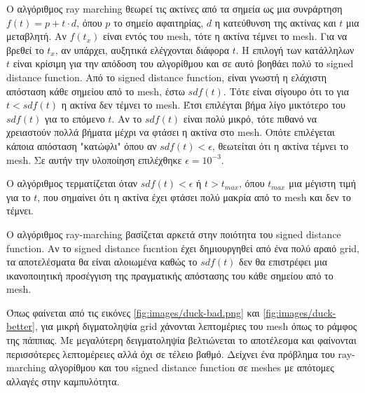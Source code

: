 \documentclass{report}
\begin{document}

Ο αλγόριθμος ray marching θεωρεί τις ακτίνες από τα σημεία ως μια συνράρτηση $f(t) = p + t \cdot d$, όπου $p$ το σημείο
αφαιτηρίας, $d$ η κατεύθυνση της ακτίνας και $t$ μια μεταβλητή. Αν $f(t_x)$ είναι εντός του mesh, τότε η ακτίνα τέμνει το mesh.
Για να βρεθεί το $t_x$, αν υπάρχει, αυξητικά ελέγχονται διάφορα $t$. Η επιλογή των κατάλληλων $t$ είναι κρίσιμη για την
απόδοση του αλγορίθμου και σε αυτό βοηθάει πολύ το signed distance function. Από το signed distance function, είναι 
γνωστή η ελάχιστη απόσταση κάθε σημείου από το mesh, έστω ${sdf}(t)$. Τότε είναι σίγουρο ότι το για $t < {sdf}(t)$ η ακτίνα
δεν τέμνει το mesh. Έτσι επιλέγται βήμα λίγο μικτότερο του ${sdf}(t)$ για το επόμενο $t$. Αν το ${sdf}(t)$ είναι πολύ μικρό,
τότε πιθανό να χρειαστούν πολλά βήματα μέχρι να φτάσει η ακτίνα στο mesh. Οπότε επιλέγεται κάποια απόσταση "κατώφλι" όπου
αν ${sdf}(t) < \epsilon$, θεωτείται ότι η ακτίνα τέμνει το mesh. Σε αυτήν την υλοποίηση επιλέχθηκε $\epsilon = 10^{-3}$.
\cite{ray-marching}


Ο αλγόριθμος τερματίζεται όταν ${sdf}(t) < \epsilon$ ή $t > t_{max}$, όπου $t_{max}$ μια μέγιστη τιμή για το $t$, που σημαίνει
ότι η ακτίνα έχει φτάσει πολύ μακρία από το mesh και δεν το τέμνει.


Ο αλγόριθμος ray-marching βασίζεται αρκετά στην ποιότητα του signed distance function. Αν το signed distance fucntion έχει
δημιουργηθεί από ένα πολύ αραιό grid, τα αποτελέσματα θα είναι αλοιωμένα καθώς το ${sdf}(t)$ δεν θα επιστρέφει μια
ικανοποιητική προσέγγιση της πραγματικής απόστασης του κάθε σημείου από το mesh.

 \label{fig:duck}

Όπως φαίνεται από τις εικόνες \ref{fig:images/duck-bad.png} και \ref{fig:images/duck-better}, για μικρή διγματοληψία grid 
χάνονται λεπτομέριες του mesh όπως το ράμφος της πάππιας. Με μεγαλύτερη δειγματοληψία βελτιώνεται το αποτέλεσμα και 
φαίνονται περισσότερες λεπτομέρειες αλλά όχι σε τέλειο βαθμό. Δείχνει ένα πρόβλημα του ray-marching αλγορίθμου και 
του signed distance function σε meshes με απότομες αλλαγές στην καμπυλότητα.

\clearpage
{}
\end{document}
